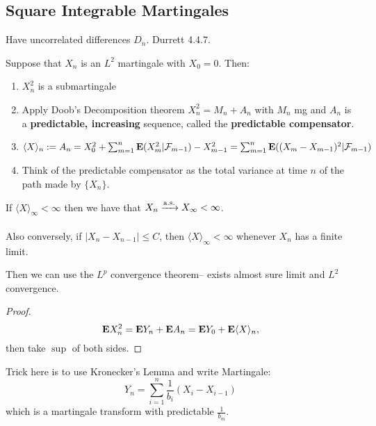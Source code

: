 \documentclass{article}
\begin{document}
\subsection{Square Integrable Martingales}

\begin{fact}
Have uncorrelated differences $D_n$. Durrett 4.4.7.
\end{fact}

Suppose that $X_n$ is an $L^2$ martingale with $X_0 = 0$. Then:
\begin{enumerate}
	\item $X_n^2$ is a submartingale
	\item Apply Doob's Decomposition theorem $X_n^2 = M_n + A_n$ with $M_n$ mg and $A_n$ is a \textbf{predictable, increasing} sequence, called the \textbf{predictable compensator}. 
	\item $\langle X \rangle_n := A_n =X_0^2 + \sum_{m=1}^n \mathbf{E}(X_m^2|\mathcal F_{m-1}) - X^2_{m-1} = \sum_{m=1}^n \mathbf{E}((X_m - X_{m-1})^2|\mathcal F_{m-1})$
	\item Think of the predictable compensator as the total variance at time $n$ of the path made by $\{X_n\}$.
\end{enumerate}

\begin{theorem}
If $\langle X \rangle_\infty<\infty$ then we have that $X_n\xrightarrow{\mathrm{a.s.}} X_\infty<\infty$. \\\\

Also conversely, if $|X_n - X_{n-1}| \leq C$, then $\langle X\rangle_\infty <\infty$ whenever $X_n$ has a finite limit. 
\end{theorem}

\begin{theorem}
Then we can use the $L^p$ convergence theorem-- exists almost sure limit and $L^2$ convergence. 
\begin{proof}
	$$\mathbf{E} X_n^2 = \mathbf{E} Y_n + \mathbf{E} A_n = \mathbf{E} Y_0 + \mathbf{E} \langle X\rangle_n,$$
	then take $\sup$ of both sides. 
\end{proof}
\end{theorem}

\begin{example}
Trick here is to use Kronecker's Lemma and write Martingale:
$$Y_n = \sum_{i=1}^n \frac{1}{b_i}(X_i - X_{i-1})$$
which is a martingale transform with predictable $\frac{1}{b_m}$. 
\end{example}
\end{document}
